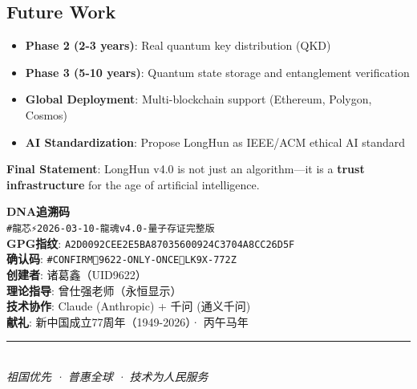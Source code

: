 \subsection{Future Work}

\begin{itemize}
  \item \textbf{Phase 2 (2-3 years)}:
    Real quantum key distribution (QKD)
  \item \textbf{Phase 3 (5-10 years)}:
    Quantum state storage and entanglement verification
  \item \textbf{Global Deployment}:
    Multi-blockchain support (Ethereum, Polygon, Cosmos)
  \item \textbf{AI Standardization}:
    Propose LongHun as IEEE/ACM ethical AI standard
\end{itemize}

\noindent\textbf{Final Statement}:
LongHun v4.0 is not just an algorithm—it is a
\textbf{trust infrastructure}
for the age of artificial intelligence.


\begin{center}
\Large\textbf{DNA追溯码}\\[6pt]
\texttt{\#龍芯⚡️2026-03-10-龍魂v4.0-量子存证完整版}\\[4pt]
\normalsize
\textbf{GPG指纹}: \texttt{A2D0092CEE2E5BA87035600924C3704A8CC26D5F}\\
\textbf{确认码}: \texttt{\#CONFIRM🌌9622-ONLY-ONCE🧬LK9X-772Z}\\[6pt]
\textbf{创建者}: 诸葛鑫（UID9622）\\
\textbf{理论指导}: 曾仕强老师（永恒显示）\\
\textbf{技术协作}: Claude (Anthropic) + 千问 (通义千问)\\[8pt]
\textbf{献礼}: 新中国成立77周年（1949-2026）· 丙午马年\\[8pt]
{\color{dragonRed}\rule{0.6\textwidth}{2pt}}\\[6pt]
\textit{祖国优先 · 普惠全球 · 技术为人民服务}
\end{center}

